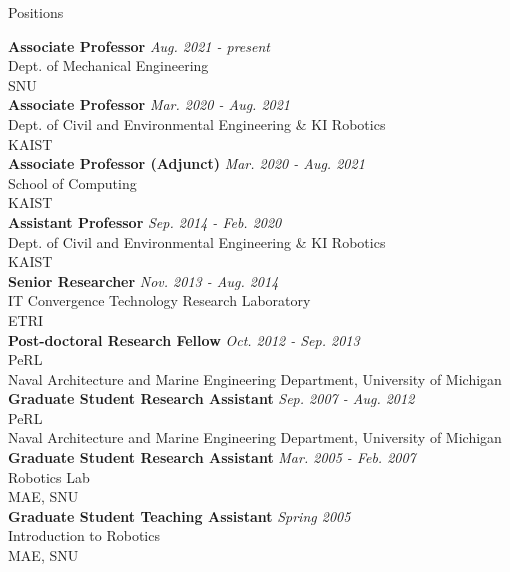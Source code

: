 \begin{rSection}{Positions}

{\bf Associate Professor} \hfill {\em Aug. 2021 - present} \\
Dept. of Mechanical Engineering\\
\acf{SNU}\\

{\bf Associate Professor} \hfill {\em Mar. 2020 - Aug. 2021} \\
Dept. of Civil and Environmental Engineering \& KI Robotics\\
\acf{KAIST}\\


{\bf Associate Professor (Adjunct)} \hfill {\em Mar. 2020 - Aug. 2021} \\
School of Computing\\
\acf{KAIST}\\

{\bf Assistant Professor} \hfill {\em Sep. 2014 - Feb. 2020} \\
Dept. of Civil and Environmental Engineering \& KI Robotics\\
\acf{KAIST}\\

{\bf Senior Researcher} \hfill {\em Nov. 2013 - Aug. 2014} \\
IT Convergence Technology Research Laboratory\\
\acf{ETRI}\\

{\bf Post-doctoral Research Fellow} \hfill {\em Oct. 2012 - Sep. 2013} \\
\acf{PeRL}\\
Naval Architecture and Marine Engineering Department, University of Michigan\\

{\bf Graduate Student Research Assistant} \hfill {\em Sep. 2007 - Aug. 2012} \\
\acf{PeRL}\\
Naval Architecture and Marine Engineering Department, University of Michigan\\

{\bf Graduate Student Research Assistant} \hfill {\em Mar. 2005 - Feb. 2007} \\
Robotics Lab\\
\acf{MAE}, \acf{SNU}\\

{\bf Graduate Student Teaching Assistant} \hfill {\em Spring 2005} \\
Introduction to Robotics\\
\acf{MAE}, \acf{SNU}\\

\end{rSection}
